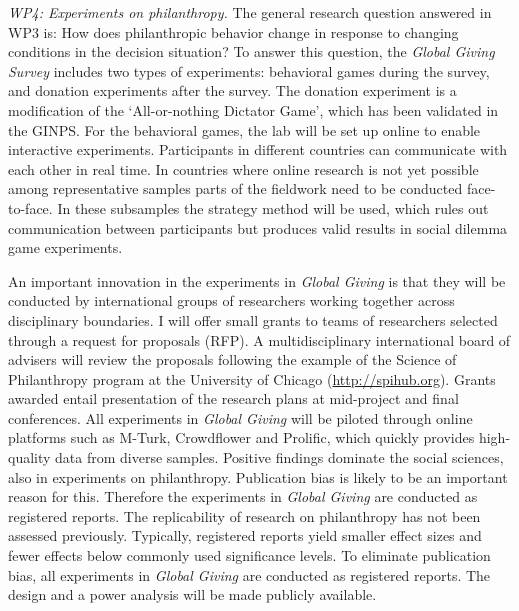 \documentclass[twocolumn, serif, rga, numeric]{jote-article}
\begin{document}
\emph{WP4: Experiments on philanthropy.} The general research question answered in WP3 is: How does philanthropic behavior change in response to changing conditions in the decision situation? To answer this question, the \emph{Global Giving Survey} includes two types of experiments: behavioral games during the survey\cite{VanLange2007}, and donation experiments after the survey. The donation experiment is a modification of the `All-or-nothing Dictator Game', which has been validated in the GINPS.\cite{VanLange2007, Bekkers2007, 134} For the behavioral games, the lab will be set up online to enable interactive experiments.
Participants in different countries can communicate with each other in real time. In countries where online research is not yet possible among representative samples parts of the fieldwork need to be conducted face-to-face. In these subsamples the strategy method will be used\cite{Selten1967}, which rules out communication between participants but produces valid results in social dilemma game experiments.\cite{Fischbacher2012}

An important innovation in the experiments in \emph{Global Giving} is that they will be conducted by international groups of researchers working together across disciplinary boundaries. I will offer small grants to teams of researchers selected through a request for proposals (RFP). A multidisciplinary international board of advisers will review the proposals following the example of the Science of Philanthropy program at the University of Chicago (\url{http://spihub.org}). Grants awarded entail presentation of the research plans at mid-project and final conferences. All experiments in \emph{Global Giving} will be piloted through online platforms such as M-Turk, Crowdflower and Prolific, which quickly provides high-quality data from diverse samples.\cite{Hauser2015, -139} Positive findings dominate the social sciences,\cite{Fanelli2012} also in experiments on philanthropy.\cite{Bekkers2007} Publication bias is likely to be an important reason for this.\cite{Simonsohn2014} Therefore the experiments in \emph{Global Giving} are conducted as registered reports.\cite{Nosek2014} The replicability of research on philanthropy has not been assessed previously. Typically, registered reports yield smaller effect sizes and fewer effects below commonly used significance levels.\cite{Chang20187, -145} To eliminate publication bias, all experiments in \emph{Global Giving} are conducted as registered reports.\cite{Nosek2014} The design and a power analysis will be made publicly available.
\end{document}
